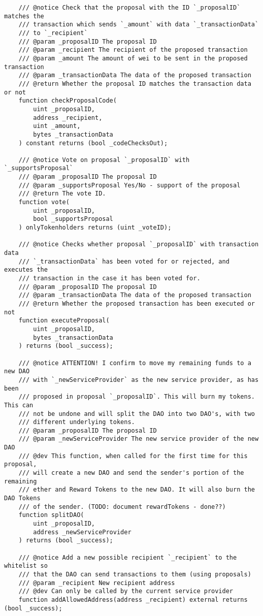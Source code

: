 \documentclass[9pt,oneside]{amsart}
\begin{document}
\begin{appendix}
\begin{verbatim}
    /// @notice Check that the proposal with the ID `_proposalID` matches the
    /// transaction which sends `_amount` with data `_transactionData`
    /// to `_recipient`
    /// @param _proposalID The proposal ID
    /// @param _recipient The recipient of the proposed transaction
    /// @param _amount The amount of wei to be sent in the proposed transaction
    /// @param _transactionData The data of the proposed transaction
    /// @return Whether the proposal ID matches the transaction data or not
    function checkProposalCode(
        uint _proposalID,
        address _recipient,
        uint _amount,
        bytes _transactionData
    ) constant returns (bool _codeChecksOut);

    /// @notice Vote on proposal `_proposalID` with `_supportsProposal`
    /// @param _proposalID The proposal ID
    /// @param _supportsProposal Yes/No - support of the proposal
    /// @return The vote ID.
    function vote(
        uint _proposalID,
        bool _supportsProposal
    ) onlyTokenholders returns (uint _voteID);

    /// @notice Checks whether proposal `_proposalID` with transaction data
    /// `_transactionData` has been voted for or rejected, and executes the
    /// transaction in the case it has been voted for.
    /// @param _proposalID The proposal ID
    /// @param _transactionData The data of the proposed transaction
    /// @return Whether the proposed transaction has been executed or not
    function executeProposal(
        uint _proposalID,
        bytes _transactionData
    ) returns (bool _success);

    /// @notice ATTENTION! I confirm to move my remaining funds to a new DAO
    /// with `_newServiceProvider` as the new service provider, as has been
    /// proposed in proposal `_proposalID`. This will burn my tokens. This can
    /// not be undone and will split the DAO into two DAO's, with two
    /// different underlying tokens.
    /// @param _proposalID The proposal ID
    /// @param _newServiceProvider The new service provider of the new DAO
    /// @dev This function, when called for the first time for this proposal,
    /// will create a new DAO and send the sender's portion of the remaining
    /// ether and Reward Tokens to the new DAO. It will also burn the DAO Tokens
    /// of the sender. (TODO: document rewardTokens - done??)
    function splitDAO(
        uint _proposalID,
        address _newServiceProvider
    ) returns (bool _success);

    /// @notice Add a new possible recipient `_recipient` to the whitelist so
    /// that the DAO can send transactions to them (using proposals)
    /// @param _recipient New recipient address
    /// @dev Can only be called by the current service provider
    function addAllowedAddress(address _recipient) external returns (bool _success);


\end{verbatim}
\end{appendix}
\end{document}
